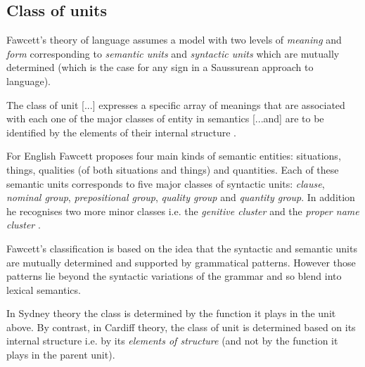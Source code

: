 \subsection{Class of units}
Fawcett's theory of language assumes a model with two levels of \textit{meaning} and \textit{form} corresponding to \textit{semantic units} and \textit{syntactic units} which are mutually determined (which is the case for any sign in a Saussurean approach to language). 

\begin{definition}\label{def:class2}
	The class of unit [...] expresses a specific array of meanings that are associated with each one of the major classes of entity in semantics [...and] are to be identified by the elements of their internal structure \citep[195]{Fawcett2000}. 
\end{definition}

For English Fawcett proposes four main kinds of semantic entities: situations, things, qualities (of both situations and things) and quantities. Each of these semantic units corresponds to five major classes of syntactic units: \textit{clause}, \textit{nominal group}, \textit{prepositional group}, \textit{quality group} and \textit{quantity group}. In addition he recognises two more minor classes i.e. the \textit{genitive cluster} and the \textit{proper name cluster} \citep[193--194]{Fawcett2000}. 


Fawcett's classification is based on the idea that the syntactic and semantic units are mutually determined and supported by grammatical patterns. However those patterns lie beyond the syntactic variations of the grammar and so blend into lexical semantics.

In Sydney theory the class is determined by the function it plays in the unit above. By contrast, in Cardiff theory, the class of unit is determined based on its internal structure i.e. by its \textit{elements of structure} (and not by the function it plays in the parent unit).  

